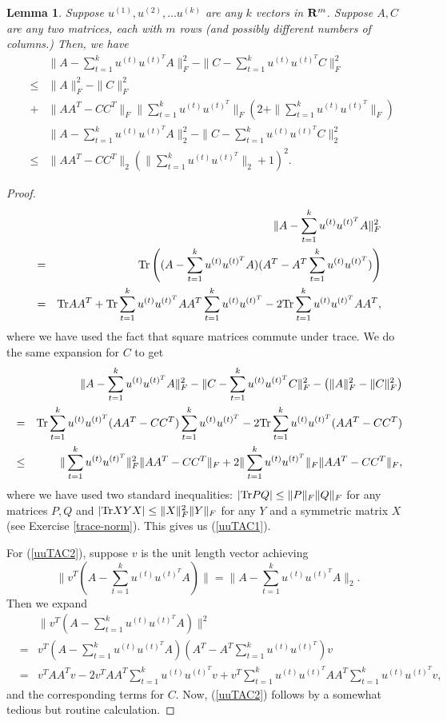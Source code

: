 \documentclass{book}
\newtheorem{lemma}[theorem]{Lemma}
\numberwithin{exercise}{chapter}
\begin{document}
\begin{lemma}\label{uuTAC}
Suppose $u^{(1)},u^{(2)},\ldots u^{(k)}$ are any $k$ vectors in ${\bf R}^m$. Suppose $A,C$ are any two
matrices, each with $m$ rows (and possibly different numbers of columns.) Then, we have
\begin{eqnarray}
&&\|A-\sum_{t=1}^ku^{(t)}u^{(t)^T}A\|_F^2-\|C-\sum_{t=1}^k u^{(t)}u^{(t)^T}C\|_F^2\nonumber\\
&\le& \|A\|_F^2-\|C\|_F^2\nonumber\\
&+& \|AA^T-CC^T\|_F\|\sum_{t=1}^ku^{(t)}u^{(t)^T}\|_F
\left( 2+\|\sum_{t=1}^ku^{(t)}u^{(t)^T}\|_F\right)\label{uuTAC1}\\
&&\|A-\sum_{t=1}^ku^{(t)}u^{(t)^T}A\|_2^2-\|C-\sum_{t=1}^ku^{(t)}u^{(t)^T}C\|_2^2\nonumber\\
&\le&
\|AA^T-CC^T\|_2\left( \|\sum_{t=1}^ku^{(t)}u^{(t)^T}\|_2+1\right)^2\label{uuTAC2}.
\end{eqnarray}
\end{lemma}

\begin{proof}
\begin{eqnarray*}
&&\|A-\sum_{t=1}^k u^{(t)}u^{(t)^T}A\|_F^2\\
&=&\hbox{Tr} \left( (A-\sum_{t=1}^ku^{(t)}u^{(t)^T}A)(A^T-A^T\sum_{t=1}^ku^{(t)}u^{(t)^T})\right)\\
&=& \hbox{Tr} AA^T +\hbox{Tr} \sum_{t=1}^ku^{(t)}u^{(t)^T}AA^T\sum_{t=1}^ku^{(t)}u^{(t)^T}-2\hbox{Tr} \sum_{t=1}^ku^{(t)}u^{(t)^T}AA^T,
\end{eqnarray*}
where we have used the fact that square matrices commute under trace.
We do the same expansion for $C$ to get
\begin{eqnarray*}
&&\|A-\sum_{t=1}^ku^{(t)}u^{(t)^T}A\|_F^2-\|C-\sum_{t=1}^ku^{(t)}u^{(t)^T}C\|_F^2 -\left(\|A\|_F^2-\|C\|_F^2\right)\\
&=& \hbox{Tr} \sum_{t=1}^ku^{(t)}u^{(t)^T}(AA^T-CC^T)\sum_{t=1}^ku^{(t)}u^{(t)^T}-2\hbox{Tr} \sum_{t=1}^ku^{(t)}u^{(t)^T}(AA^T-CC^T)\\
&\leq& \|\sum_{t=1}^ku^{(t)}u^{(t)^T}\|_F^2\|AA^T-CC^T\|_F+2\|\sum_{t=1}^ku^{(t)}u^{(t)^T}\|_F\|AA^T-CC^T\|_F,
\end{eqnarray*}
where we have used two standard inequalities: $|\hbox{Tr} PQ|\leq \|P\|_F\|Q\|_F$ for any matrices $P,Q$
and $|\hbox{Tr} XYX|\leq \|X\|_F^2\|Y\|_F$ for any $Y$ and a symmetric matrix $X$ (see Exercise \ref{trace-norm}).
This gives us (\ref{uuTAC1}).

For (\ref{uuTAC2}), suppose $v$ is the unit length vector achieving
\[
\|v^T(A-\sum_{t=1}^ku^{(t)}u^{(t)^T}A)\|=
\|A-\sum_{t=1}^ku^{(t)}u^{(t)^T}A\|_2.
\]
Then we expand
\begin{eqnarray*}
&&\|v^T(A-\sum_{t=1}^ku^{(t)}u^{(t)^T}A)\|^2\\
&=&v^T(A-\sum_{t=1}^ku^{(t)}u^{(t)^T}A)(A^T-A^T\sum_{t=1}^ku^{(t)}u^{(t)^T})v\\
&=&v^TAA^Tv-2v^TAA^T\sum_{t=1}^ku^{(t)}u^{(t)^T}v+v^T\sum_{t=1}^ku^{(t)}u^{(t)^T}AA^T\sum_{t=1}^ku^{(t)}u^{(t)^T}v,
\end{eqnarray*}
and the corresponding terms for $C$. Now, (\ref{uuTAC2}) follows by a somewhat tedious but routine calculation.
\end{proof}
\end{document}
